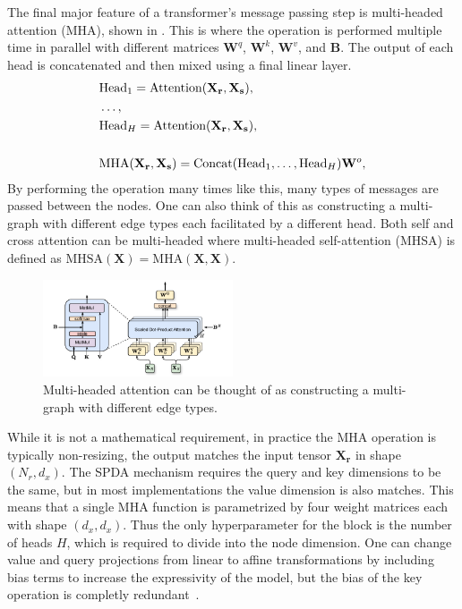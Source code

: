 The final major feature of a transformer's message passing step is multi-headed attention (MHA), shown in .
This is where the operation is performed multiple time in parallel with different matrices $\mathbf{W}^q$, $\mathbf{W}^k$, $\mathbf{W}^v$, and $\mathbf{B}$.
The output of each head is concatenated and then mixed using a final linear layer.
\begin{equation}
    \begin{aligned}
    & \text{Head}_1 = \text{Attention}(\mathbf{X_r}, \mathbf{X_s}), \\
    & \ldots, \\
    & \text{Head}_H = \text{Attention}(\mathbf{X_r}, \mathbf{X_s}), \\
    \vphantom{x} \\
    & \text{MHA}(\mathbf{X_r}, \mathbf{X_s}) = \text{Concat}(\text{Head}_1, \ldots, \text{Head}_H) \mathbf{W}^o,
    \end{aligned}
\end{equation}
By performing the operation many times like this, many types of messages are passed between the nodes.
One can also think of this as constructing a multi-graph with different edge types each facilitated by a different head.
Both self and cross attention can be multi-headed where multi-headed self-attention (MHSA) is defined as $\text{MHSA}(\mathbf{X}) = \text{MHA}(\mathbf{X}, \mathbf{X})$.

\begin{figure}
    \centering
    \includegraphics[width=0.5\textwidth]{Figures/transformers/mha.pdf}
    \caption{Multi-headed attention can be thought of as constructing a multi-graph with different edge types.}
    \label{fig:mha}
\end{figure}

While it is not a mathematical requirement, in practice the MHA operation is typically non-resizing, the output matches the input tensor $\mathbf{X_r}$ in shape $(N_r, d_x)$.
The SPDA mechanism requires the query and key dimensions to be the same, but in most implementations the value dimension is also matches.
This means that a single MHA function is parametrized by four weight matrices each with shape $(d_x, d_x)$.
Thus the only hyperparameter for the block is the number of heads $H$, which is required to divide into the node dimension.
One can change value and query projections from linear to affine transformations by including bias terms to increase the expressivity of the model, but the bias of the key operation is completly redundant~.


